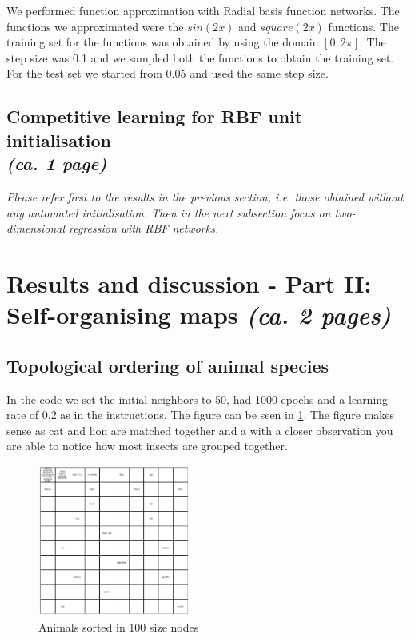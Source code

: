 \documentclass[a4paper]{article}
\begin{document}
We performed function approximation with Radial basis function networks. The functions we approximated were the $sin(2x)$ and $square(2x)$ functions. The training set for the functions was obtained by using the domain $[0:2\pi]$. The step size was 0.1 and we sampled both the functions to obtain the training set. For the test set we started from 0.05 and used the same step size.  



\subsection{Competitive learning for RBF unit initialisation\\ \normalsize{\textit{(ca. 1 page)}}}
\textit{Please refer first to the results in the previous section, i.e. those obtained without any automated initialisation. Then in the next subsection focus on two-dimensional regression with RBF networks.}


\section{Results and discussion - Part II: Self-organising maps \normalsize{\textit{(ca. 2 pages)}}}

\subsection{Topological ordering of animal species}
In the code we set the initial neighbors to 50, had 1000 epochs and a learning rate of 0.2 as in the instructions. The figure can be seen in \ref{fig:SOM_animals}. The figure makes sense as cat and lion are matched together and a with a closer observation you are able to notice how most insects are grouped together. 

\begin{figure} [htb]
    \centering
    \includegraphics[width=5cm]{Labs/Lab 2/Results/animal_som.png}
    \caption{Animals sorted in 100 size nodes}
    \label{fig:SOM_animals}
\end{figure}
\end{document}
